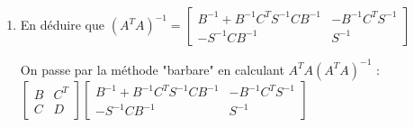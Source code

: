 \documentclass[a4paper,fleqn]{article}
\begin{document}
\begin{enumerate}
\begin{enumerate}
 \item Soit $y, z \neq 0 \in \Re^{\frac{n}{2}}$  : \newline 
 $
x^TA^TAx = (y^T z^T)
\begin{bmatrix}
    B & C^{T} \\
    C & D
\end{bmatrix}
\begin{bmatrix}
    y \\
    z
\end{bmatrix}
= (y^T z^T)
\begin{bmatrix}
    By + C^{T}z \\
    Cy + Dz
\end{bmatrix} \newline\newline
= y^TBy + y^TC^Tz + z^TCy + z^TDz \newline\newline
= y^TBy + y^TBB^{-1}C^Tz + z^TCB^{-1}By + z^TCB^{-1}BB^{-1}C^Tz + z^TDz - z^TCB^{-1}C^Tz \newline \newline
= (y + B^{-1}C^Tz)^T B (y + B^{-1}C^Tz) + z^T (D - CB^{-1}C^T)z
$
 
 \item Or, soit y un vecteur non nul tel que $y = -B^{-1}C^Tz$ alors : \newline $x^TA^TAx > 0 \iff z^TSz > 0$.

\end{enumerate}
    

  \item En déduire que $(A^{T} A)^{-1} = \left[\begin{array}{cc}B^{-1}+B^{-1} C^{T} S^{-1} C B^{-1} & -B^{-1} C^{T} S^{-1} \\ -S^{-1} C B^{-1} & S^{-1}\end{array}\right]$ \newline
  
 On passe par la méthode "barbare" en calculant $A^{T} A(A^{T} A)^{-1}$ : \newline $\left[\begin{array}{cc}B & C^{T} \\ C & D\end{array}\right] \left[\begin{array}{cc}B^{-1}+B^{-1} C^{T} S^{-1} C B^{-1} & -B^{-1} C^{T} S^{-1} \\ -S^{-1} C B^{-1} & S^{-1}\end{array}\right] $
   \begin{enumerate}
  

\end{enumerate}
\end{enumerate}
\end{document}
